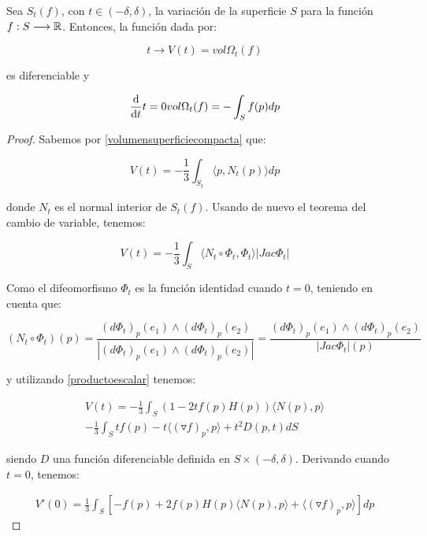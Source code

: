 \begin{remark}
Sea $S_t(f)$, con $t \in (-\delta, \delta)$, la variación de la superficie $S$ para la función $f: S \longrightarrow \mathbb{R}$. Entonces, la función dada por:

\begin{equation*}
    t \longrightarrow V(t) = vol \Omega_t (f)
\end{equation*}

es diferenciable y

\begin{equation}\label{variacionvolumen}
    \diff{}{t}{t=0} vol \Omega_t (f) = - \int_S f(p) dp
\end{equation}
\begin{proof}
Sabemos por \ref{volumensuperficiecompacta} que:

\begin{equation*}
    V(t) = - \frac{1}{3} \int_{S_t}  \langle p, N_t(p) \rangle  dp
\end{equation*}

donde $N_t$ es el normal interior de $S_t(f)$. Usando de nuevo el teorema del cambio de variable, tenemos:

\begin{equation*}
    V(t) = - \frac{1}{3} \int_{S}  \langle N_t \circ \Phi_t, \Phi_t \rangle |Jac \Phi_t|
\end{equation*}

Como el difeomorfismo $\Phi_t$ es la función identidad cuando $t=0$, teniendo en cuenta que:

\begin{equation*}
    (N_t \circ \Phi_t)(p) = \frac{(d\Phi_t)_p(e_1) \wedge (d\Phi_t)_p(e_2)}{|(d\Phi_t)_p(e_1) \wedge (d\Phi_t)_p(e_2)|} = \frac{(d\Phi_t)_p(e_1) \wedge (d\Phi_t)_p(e_2)}{|Jac \Phi_t|(p)}
\end{equation*}

y utilizando \autoref{productoescalar} tenemos:

\begin{align*}
    V(t) = - \frac{1}{3} \int_S (1-2tf(p)H(p)) \langle N(p), p \rangle  \\ - \frac{1}{3} \int_S tf(p) - t \langle (\triangledown f)_p, p \rangle  + t^2D(p,t) dS
\end{align*}

siendo $D$ una función diferenciable definida en $S \times (-\delta, \delta)$. Derivando cuando $t=0$, tenemos:

\begin{align*}
    V'(0) = \frac{1}{3} \int_S [-f(p) + 2f(p)H(p) \langle N(p),p \rangle  +  \langle (\triangledown f)_p, p \rangle ] dp
\end{align*}


\end{proof}
\end{remark}
